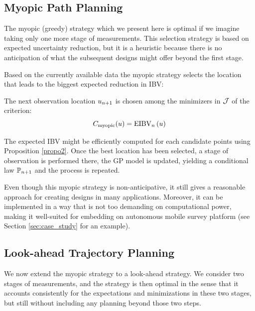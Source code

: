 \documentclass[aoas]{imsart}
\begin{document}
\subsection{Myopic Path Planning}
\label{sec:myopic}

The myopic (greedy) strategy which we present here is optimal if we
imagine taking only one more stage of measurements. This selection
strategy is based on expected uncertainty reduction, but it is a
heuristic because there is no anticipation of what the subsequent
designs might offer beyond the first stage.

Based on the currently available data the myopic strategy selects the location that leads to the biggest expected reduction in IBV:
\begin{criterion}[Myopic]
The next observation location $u_{n + 1}$ is chosen among the minimizers in $\mathcal{J}$ of the criterion:
\begin{equation}\label{critSEQ}
     C_{\text{myopic}}(u) = \EIBV_{\stage}\left(\spatloc\right)
\end{equation}
\end{criterion}

The expected IBV might be efficiently computed for each candidate points using Proposition \ref{propo2}. Once the best location has been selected, a stage of observation is performed there, the GP model is updated, yielding a conditional law $\mathbb{P}_{n + 1}$ and the process is repeated.

Even though this myopic strategy is non-anticipative, it still gives a
reasonable approach for creating designs in many
applications. Moreover, it can be implemented in a way that is not too demanding on computational power, making it well-suited for embedding on autonomous mobile survey platform (see Section \ref{sec:case_study} for an example).


\subsection{Look-ahead Trajectory Planning}\label{sec:LA}

We now extend the myopic strategy to a look-ahead strategy. We consider two stages of
measurements, and the strategy is then optimal in the sense that it accounts consistently for the expectations and minimizations in these two stages, but still without including any planning beyond those two steps.

\medskip
\end{document}
